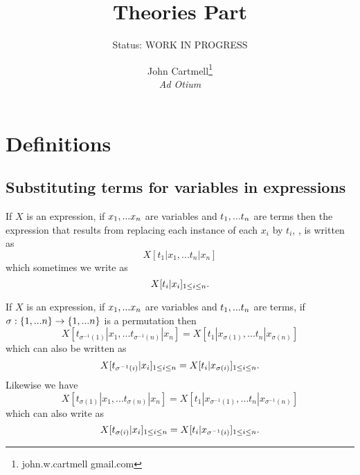 \documentclass[10pt,a4paper]{scrartcl}
\title{ Theories Part}
\author{John Cartmell\footnote{john.w.cartmell gmail.com}\\ \normalsize{\textit{Ad Otium}}}
\subtitle{Status: \normalsize{WORK IN PROGRESS}}
\begin{document}
\maketitle

\section{Definitions}

\newcommand{\sEquiv}{\equiv}
\newcommand{\wEquivOne}[2]{#1\ we_1\ #2}
\newcommand{\wEquivTwo}[2]{#1\ we_2\ #2}
\newcommand{\GAT}{generalised algebraic theory\ }


\subsection{Substituting terms for variables in expressions}

If $X$ is an expression, if  $x_1,...x_n$ are variables and $t_1,...t_n$ are terms then 
the expression that results from replacing each instance of each $x_i$ by $t_i$, \foreachi,
 is  written as
\begin{equation*}
X[t_1|x_1,...t_n|x_n]
\end{equation*}
which sometimes we write as
\begin{equation*}
X[t_i|x_i]_{1 \leq i \leq n}.
\end{equation*}


\begin{observation}
If $X$ is an expression, if  $x_1,...x_n$ are variables and $t_1,...t_n$ are terms,
if $\sigma: \left\{1,...n\right\} \rightarrow \left\{1,...n\right\}$ is a permutation 
then 
\begin{equation}
X[t_{\sigma^{-1}(1)}|x_1,...t_{\sigma^{-1}(n)} | x_n] = X[t_1|x_{\sigma(1)},...t_n| x_{\sigma(n)}]
\end{equation}
which can also be written as
\begin{equation}
X[t_{\sigma^{-1}(i)}|x_i]_{1 \leq i \leq n} = X[t_i|x_{\sigma(i)}]_{1 \leq i \leq n}.
\end{equation}
Likewise we have
\begin{equation}
X[t_{\sigma(1)}|x_1,...t_{\sigma(n)} | x_n] = X[t_1|x_{\sigma^{-1}(1)},...t_n| x_{\sigma^{-1}(n)}]
\end{equation}
which can also write as
\begin{equation}
X[t_{\sigma(i)}|x_i]_{1 \leq i \leq n} = X[t_i|x_{\sigma^{-1}(i)}]_{1 \leq i \leq n}.
\end{equation}

\end{observation}
\end{document}
